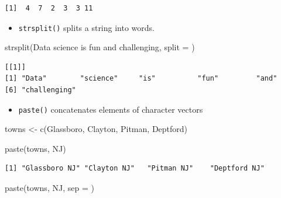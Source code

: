 \documentclass[
  letterpaper,
  DIV=11,
  numbers=noendperiod]{scrreprt}
\newenvironment{Shaded}{\begin{snugshade}}{\end{snugshade}}
\newcommand{\AttributeTok}[1]{\textcolor[rgb]{0.40,0.45,0.13}{#1}}
\newcommand{\FunctionTok}[1]{\textcolor[rgb]{0.28,0.35,0.67}{#1}}
\newcommand{\NormalTok}[1]{\textcolor[rgb]{0.00,0.23,0.31}{#1}}
\newcommand{\OtherTok}[1]{\textcolor[rgb]{0.00,0.23,0.31}{#1}}
\newcommand{\StringTok}[1]{\textcolor[rgb]{0.13,0.47,0.30}{#1}}
\providecommand{\tightlist}{%
  \setlength{\itemsep}{0pt}\setlength{\parskip}{0pt}}\usepackage{longtable,booktabs,array}
\begin{document}
\begin{verbatim}
[1]  4  7  2  3  3 11
\end{verbatim}

\begin{itemize}
\tightlist
\item
  \texttt{strsplit()} splits a string into words.
\end{itemize}

\begin{Shaded}
\begin{Highlighting}[]
\FunctionTok{strsplit}\NormalTok{(}\StringTok{\textquotesingle{}Data science is fun and challenging\textquotesingle{}}\NormalTok{, }\AttributeTok{split =} \StringTok{\textquotesingle{} \textquotesingle{}}\NormalTok{)}
\end{Highlighting}
\end{Shaded}

\begin{verbatim}
[[1]]
[1] "Data"        "science"     "is"          "fun"         "and"        
[6] "challenging"
\end{verbatim}

\begin{itemize}
\tightlist
\item
  \texttt{paste()} concatenates elements of character vectors
\end{itemize}

\begin{Shaded}
\begin{Highlighting}[]
\NormalTok{towns }\OtherTok{\textless{}{-}} \FunctionTok{c}\NormalTok{(}\StringTok{\textquotesingle{}Glassboro\textquotesingle{}}\NormalTok{, }\StringTok{\textquotesingle{}Clayton\textquotesingle{}}\NormalTok{, }\StringTok{\textquotesingle{}Pitman\textquotesingle{}}\NormalTok{, }\StringTok{\textquotesingle{}Deptford\textquotesingle{}}\NormalTok{)}

\FunctionTok{paste}\NormalTok{(towns, }\StringTok{\textquotesingle{}NJ\textquotesingle{}}\NormalTok{)}
\end{Highlighting}
\end{Shaded}

\begin{verbatim}
[1] "Glassboro NJ" "Clayton NJ"   "Pitman NJ"    "Deptford NJ" 
\end{verbatim}

\begin{Shaded}
\begin{Highlighting}[]
\FunctionTok{paste}\NormalTok{(towns, }\StringTok{\textquotesingle{}NJ\textquotesingle{}}\NormalTok{, }\AttributeTok{sep =} \StringTok{\textquotesingle{} \textquotesingle{}}\NormalTok{)}
\end{Highlighting}
\end{Shaded}
\end{document}
